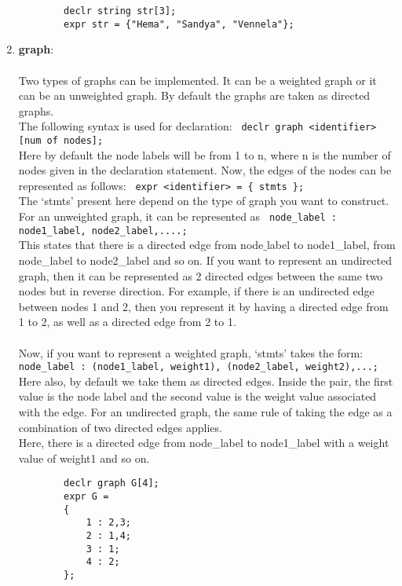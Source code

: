 \documentclass[journal, 18pt]{report}
\begin{document}
\begin{enumerate}
\begin{lstlisting}
        declr string str[3];
        expr str = {"Hema", "Sandya", "Vennela"};
    \end{lstlisting}
    \item \textbf{graph}:\\\\ Two types of graphs can be implemented. It can be a weighted graph or it can be an unweighted graph. By default the graphs are taken as directed graphs.\\
    The following syntax is used for declaration: \texttt{ declr graph <identifier>[num of nodes];}\\
    Here by default the node labels will be from 1 to n, where n is the number of nodes given in the declaration statement.
    Now, the edges of the nodes can be represented as follows: \texttt{ expr <identifier> = \{ stmts \};}\\
    The `stmts' present here depend on the type of graph you want to construct. For an unweighted graph, it can be represented as \texttt{ node\_label : node1\_label, node2\_label,....;}\\
    This states that there is a directed edge from node$\_$label to node1\_label, from node\_label to node2\_label and so on. If you want to represent an undirected graph, then it can be represented as 2 directed edges between the same two nodes but in reverse direction. For example, if there is an undirected edge between nodes 1 and 2, then you represent it by having a directed edge from 1 to 2, as well as a directed edge from 2 to 1.\\\\
    Now, if you want to represent a weighted graph, `stmts' takes the form: \texttt{ node\_label : (node1\_label, weight1), (node2\_label, weight2),...;}\\
    Here also, by default we take them as directed edges. Inside the pair, the first value is the node label and the second value is the weight value associated with the edge. For an undirected graph, the same rule of taking the edge as a combination of two directed edges applies.\\
    Here, there is a directed edge from node\_label to node1\_label with a weight value of weight1 and so on.\\
    \begin{lstlisting}
        declr graph G[4]; 
        expr G = 
        {
            1 : 2,3;
            2 : 1,4;
            3 : 1;
            4 : 2;
        };


\end{lstlisting}
\end{enumerate}
\end{document}
